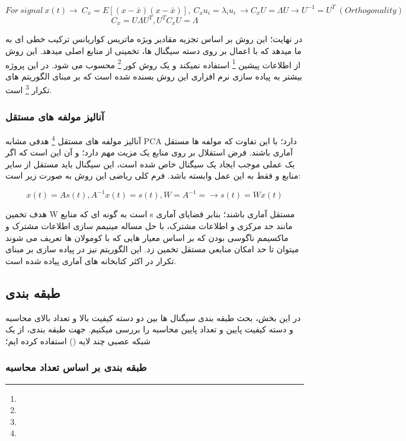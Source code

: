 \documentclass[11pt]{extarticle}
\begin{document}
$$ For \: signal \: x(t) \rightarrow \: C_x = E[(x-\bar{x})(x-\bar{x})], \: C_x u_i = \lambda_i u_i \: \rightarrow C_x U = \Lambda U \rightarrow U^{-1} = U^{T} \: (Orthogonality)$$
$$ C_x = U \Lambda U^{T}, U^{T} C_x U = \Lambda $$

در نهایت؛ این روش بر اساس تجزیه مقادیر ویژه ماتریس کواریانس ترکیب خطی ای به ما میدهد که با اعمال بر روی دسته سیگنال ها، تخمینی از منابع اصلی میدهد. این روش از اطلاعات پیشین
\footnote{}
 استفاده نمیکند و یک روش کور
\footnote{}
  محسوب می شود. در این پروژه بیشتر به پیاده سازی نرم افزاری این روش بسنده شده است که بر مبنای الگوریتم های تکرار 
\footnote{}
است.

\subsubsection{آنالیز مولفه های مستقل}
	
آنالیز مولفه های مستقل
\footnote{}
هدفی مشابه PCA دارد؛ با این تفاوت که مولفه ها مستقل آماری باشند. فرض استقلال بر روی منابع یک مزیت مهم دارد؛ و آن این است که اگر یک عملی موجب ایجاد یک سیگنال خاص شده است، این سیگنال باید مستقل از سایر منابع و فقط به این عمل وابسته باشد. فرم کلی ریاضی این روش به صورت زیر است:

$$ x(t) = A s(t), A^{-1} x(t) = s(t), W = A^{-1} =\rightarrow s(t) = W x(t) $$

هدف تخمین W است به گونه ای که منابع s مستقل آماری باشند؛ بنابر قضایای آماری مانند حد مرکزی و اطلاعات مشترک، با حل مساله مینیمم سازی اطلاعات مشترک و ماکسیمم ناگوسی بودن که بر اساس معیار هایی که با کومولان ها تعریف می شوند میتوان تا حد امکان منابعی مستقل تخمین زد. این الگوریتم نیز در پیاده سازی بر مبنای تکرار در اکثر کتابخانه های آماری پیاده شده است.

\subsection{طبقه بندی}

در این بخش، بحث طبقه بندی سیگنال ها بین دو دسته کیفیت بالا و تعداد بالای محاسبه و دسته کیفیت پایین و تعداد پایین محاسبه را بررسی میکنیم. جهت طبقه بندی، از یک شبکه عصبی چند لایه 
()
استفاده کرده ایم؛ 

\subsubsection{طبقه بندی بر اساس تعداد محاسبه}
\end{document}
